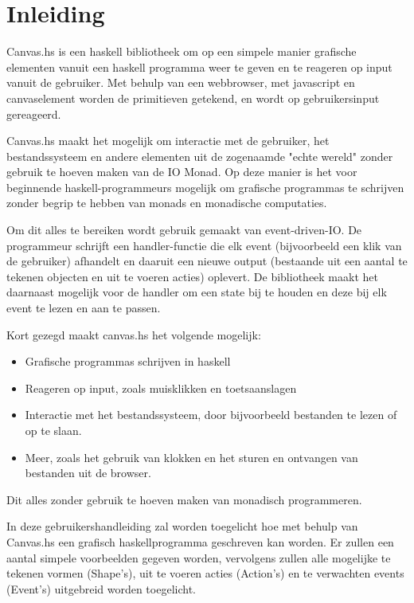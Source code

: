 \chapter{Inleiding}

Canvas.hs is een haskell bibliotheek om op een simpele manier grafische elementen vanuit een haskell programma weer te geven en te reageren op input vanuit de gebruiker. Met behulp van een webbrowser, met javascript en canvaselement worden de primitieven getekend, en wordt op gebruikersinput gereageerd.

Canvas.hs maakt het mogelijk om interactie met de gebruiker, het bestandssysteem en andere elementen uit de zogenaamde "echte wereld" zonder gebruik te hoeven maken van de IO Monad. Op deze manier is het voor beginnende haskell-programmeurs mogelijk om grafische programmas te schrijven zonder begrip te hebben van monads en monadische computaties.

Om dit alles te bereiken wordt gebruik gemaakt van event-driven-IO. De programmeur schrijft een handler-functie die elk event (bijvoorbeeld een klik van de gebruiker) afhandelt en daaruit een nieuwe output (bestaande uit een aantal te tekenen objecten en uit te voeren acties) oplevert. De bibliotheek maakt het daarnaast mogelijk voor de handler om een state bij te houden en deze bij elk event te lezen en aan te passen. 

Kort gezegd maakt canvas.hs het volgende mogelijk:
\begin{itemize}
	\item Grafische programmas schrijven in haskell
	\item Reageren op input, zoals muisklikken en toetsaanslagen
	\item Interactie met het bestandssysteem, door bijvoorbeeld bestanden te lezen of op te slaan.
	\item Meer, zoals het gebruik van klokken en het sturen en ontvangen van bestanden uit de browser.
\end{itemize}
Dit alles zonder gebruik te hoeven maken van monadisch programmeren. 


In deze gebruikershandleiding zal worden toegelicht hoe met behulp van Canvas.hs een grafisch haskellprogramma geschreven kan worden. Er zullen een aantal simpele voorbeelden gegeven worden, vervolgens zullen alle mogelijke te tekenen vormen (Shape's), uit te voeren acties (Action's) en te verwachten events (Event's) uitgebreid worden toegelicht. 